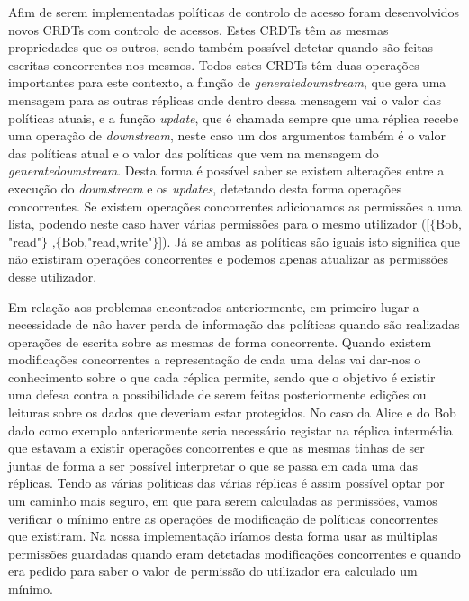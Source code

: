 \documentclass[runningheads,a4paper]{llncs}
\begin{document}
Afim de serem implementadas políticas de controlo de acesso foram desenvolvidos novos CRDTs com controlo de acessos. Estes CRDTs têm as mesmas propriedades que os outros, sendo também possível detetar quando são feitas escritas concorrentes nos mesmos. Todos estes CRDTs têm duas operações importantes para este contexto, a função de \textit{generatedownstream}, que gera uma mensagem para as outras réplicas onde dentro dessa mensagem vai o valor das políticas atuais, e a função \textit{update}, que é chamada sempre que uma réplica recebe uma operação de \textit{downstream}, neste caso um dos argumentos também é o valor das políticas atual e o valor das políticas que vem na mensagem do \textit{generatedownstream}. Desta forma é possível saber se existem alterações entre a execução do \textit{downstream} e os \textit{updates}, detetando desta forma operações concorrentes. 
Se existem operações concorrentes adicionamos as permissões a uma lista, podendo neste caso haver várias permissões para o mesmo utilizador ([$\lbrace$Bob, "read"$\rbrace$ ,$\lbrace$Bob,"read,write"$\rbrace$]). Já se ambas as políticas são iguais isto significa que não existiram operações concorrentes e podemos apenas atualizar as permissões desse utilizador.

Em relação aos problemas encontrados anteriormente, em primeiro lugar a necessidade de não haver perda de informação das políticas quando são realizadas operações de escrita sobre as mesmas de forma concorrente. Quando existem modificações concorrentes a representação de cada uma delas vai dar-nos o conhecimento sobre o que cada réplica permite, sendo que o objetivo é existir uma defesa contra a possibilidade de serem feitas posteriormente edições ou leituras sobre os dados que deveriam estar protegidos. No caso da Alice e do Bob dado como exemplo anteriormente seria necessário registar na réplica intermédia que estavam a existir operações concorrentes e que as mesmas tinhas de ser juntas de forma a ser possível interpretar o que se passa em cada uma das réplicas. Tendo as várias políticas das várias réplicas é assim possível optar por um caminho mais seguro, em que para serem calculadas as permissões, vamos verificar o mínimo entre as operações de modificação de políticas concorrentes que existiram. Na nossa implementação iríamos desta forma usar as múltiplas permissões guardadas quando eram detetadas modificações concorrentes e quando era pedido para saber o valor de permissão do utilizador era calculado um mínimo.
\end{document}
